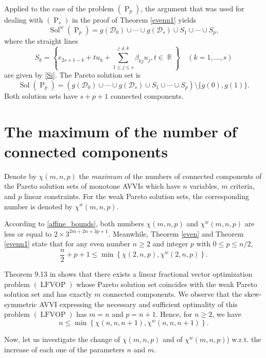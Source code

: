 \documentclass[smallextended,envcountsect]{svjour3}       %
\DeclareMathOperator{\Sol}{Sol}
\DeclareMathOperator{\Pa}{P}
\DeclareMathOperator{\LFVOP}{LFVOP}
\DeclareMathOperator{\R}{\mathbb{R}}
\begin{document}
\begin{remark} Applied to the case of the problem $(\Pa_p)$, the argument that was used for dealing with $(\Pa_s)$ in the proof of Theorem \ref{evenn1} yields
	$$\Sol^w(\Pa_p)=g(\mathcal{D}_0)\cup\cdots\cup g(\mathcal{D}_s)\cup  S_1\cup\cdots\cup S_p,$$ where the straight lines $$S_k=\left\lbrace e_{2s+1-k}+ tu_k+\sum_{1\leq j \leq s}^{j\neq k}\beta_{kj}u_j, t\in \R\right\rbrace\quad (k=1,...,s)$$ are given by \eqref{Si}. The Pareto solution set is
	$$\Sol(\Pa_p)=\left( g(\mathcal{D}_0)\cup\cdots\cup g(\mathcal{D}_s)\cup  S_1\cup\cdots\cup S_p\right)\setminus\{g(0),g(1)\}.$$
 Both solution sets have $s+p+1$ connected components.
\end{remark}

\section{The maximum of the number of connected components}

Denote by $\chi(m,n,p)$ the \textit{maximum} of the numbers of connected components of the Pareto solution sets of monotone AVVIs which have $n$ variables, $m$ criteria, and $p$ linear constraints. For the weak Pareto solution sets, the corresponding number is denoted by $\chi^w(m,n,p)$. 


\begin{remark} According to \eqref{affine_bounds}, both numbers $\chi(m,n,p)$ and $\chi^w(m,n,p)$ are less or equal to $2\times3^{2m+2n+3p+1}$. Meanwhile, Theorem \ref{even} and Theorem \ref{evenn1}  state that for any even number $n\geq 2$ and integer $p$ with $0 \leq p \leq n/2$, 
$$\frac{n}{2}+p+1\leq \min\left\{\chi(2,n,p), \chi^w(2,n,p)\right\}.$$\end{remark}

\begin{remark} Theorem 9.13 in \cite{Yen2012} shows that there exists a linear fractional vector optimization problem $(\LFVOP)$ whose Pareto solution set coincides with the weak Pareto solution set and has exactly $m$ connected components. We observe that the skew-symmetric AVVI expressing the necessary and sufficient optimality of this problem $(\LFVOP)$ has $m=n$ and $p=n+1$.
Hence, for $n\geq 2$, we have
$$n\leq \min\left\lbrace \chi(n,n,n+1), \chi^w(n,n,n+1)\right\rbrace.$$
\end{remark}

Now, let us investigate the change of $\chi(m,n,p)$ and of $\chi^w(m,n,p)$) w.r.t. the increase of each one of the parameters $n$ and $m$.
\end{document}
